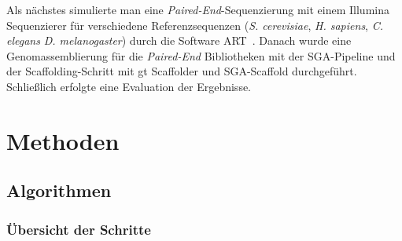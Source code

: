 \documentclass[a4paper,11pt,parskip]{scrartcl}
\begin{document}
Als nächstes simulierte man eine \textit{Paired-End}-Sequenzierung mit
einem Illumina Sequenzierer für verschiedene Referenzsequenzen
(\textit{S. cerevisiae}, \textit{H. sapiens}, \textit{C. elegans}
 \textit{D. melanogaster}) durch die Software ART~\cite{Huang:2012kq}.
Danach wurde eine Genomassemblierung für die \textit{Paired-End}
Bibliotheken mit der SGA-Pipeline und der Scaffolding-Schritt
mit gt Scaffolder und SGA-Scaffold durchgeführt. Schließlich erfolgte
eine Evaluation der Ergebnisse.

\section{Methoden}
\label{sec: Methoden}

\subsection{Algorithmen}
\subsubsection{Übersicht der Schritte}
\end{document}

